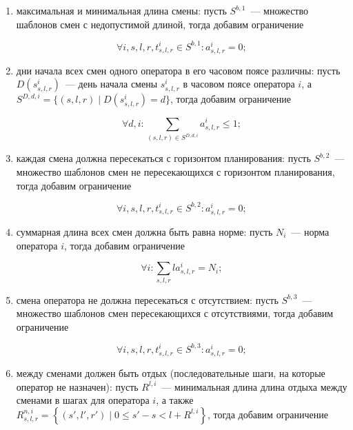 \documentclass[times,specification,annotation]{itmo-student-thesis}
\begin{document}
\begin{enumerate}
    \item максимальная и минимальная длина смены: пусть $S^{b, 1}$~--- множество шаблонов смен с недопустимой длиной, тогда добавим ограничение

    \begin{equation} \forall i, s, l, r, t^i_{s, l, r} \in S^{b, 1} : a^i_{s, l, r} = 0; \label{nsp_reduction_filter_variables_1}\end{equation}

    \item дни начала всех смен одного оператора в его часовом поясе различны: пусть $D(s^i_{s, l, r})$~--- день начала смены $s^i_{s, l, r}$ в часовом поясе оператора $i$, а $S^{D, d, i} = \{ (s, l, r) \mid D(s^i_{s, l, r}) = d\}$, тогда добавим ограничение

    \begin{equation} \forall d, i : \sum\limits_{(s, l, r) \in S^{D, d, i}} a^i_{s, l, r} \le 1; \end{equation}

    \item каждая смена должна пересекаться с горизонтом планирования: пусть $S^{b, 2}$~--- множество шаблонов смен не пересекающихся с горизонтом планирования, тогда добавим ограничение

    \begin{equation} \forall i, s, l, r, t^i_{s, l, r} \in S^{b, 2} : a^i_{s, l, r} = 0; \label{nsp_reduction_filter_variables_2}\end{equation}

    \item суммарная длина всех смен должна быть равна норме: пусть $N_i$~--- норма оператора $i$, тогда добавим ограничение

    \begin{equation} \forall i : \sum\limits_{s, l, r} l a^i_{s, l, r} = N_i; \end{equation}

    \item смена оператора не должна пересекаться с отсутствием: пусть $S^{b, 3}$~--- множество шаблонов смен пересекающихся с отсутствиями, тогда добавим ограничение

    \begin{equation} \forall i, s, l, r, t^i_{s, l, r} \in S^{b, 3} : a^i_{s, l, r} = 0; \label{nsp_reduction_filter_variables_3}\end{equation}

    \item между сменами должен быть отдых (последовательные шаги, на которые оператор не назначен): пусть $R^{l, i}$~--- минимальная длина длина отдыха между сменами в шагах для оператора $i$, а также $R^{n, i}_{s, l, r} = \left\{ (s', l', r') \mid 0 \le s' - s < l + R^{l, i} \right\}$, тогда добавим ограничение


\end{enumerate}
\end{document}
